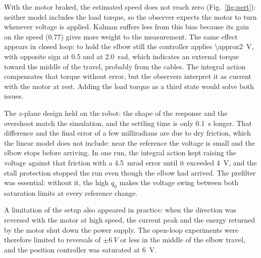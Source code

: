 \documentclass[conference,a4paper]{IEEEtran}
\begin{document}
With the motor braked, the estimated speed does not reach zero (Fig.~\ref{fig:pert}): neither model includes the load torque, so the observer expects the motor to turn whenever voltage is applied. Kalman suffers less from this bias because its gain on the speed ($0.77$) gives more weight to the measurement. The same effect appears in closed loop: to hold the elbow still the controller applies \SI{\approx2}{V}, with opposite sign at 0.5 and at \SI{2.0}{rad}, which indicates an external torque toward the middle of the travel, probably from the cables. The integral action compensates that torque without error, but the observers interpret it as current with the motor at rest. Adding the load torque as a third state would solve both issues.

The $z$-plane design held on the robot: the shape of the response and the overshoot match the simulation, and the settling time is only \SI{0.1}{s} longer. That difference and the final error of a few milliradians are due to dry friction, which the linear model does not include: near the reference the voltage is small and the elbow stops before arriving. In one run, the integral action kept raising the voltage against that friction with a \SI{4.5}{mrad} error until it exceeded \SI{4}{V}, and the stall protection stopped the run even though the elbow had arrived. The prefilter was essential: without it, the high $q_0$ makes the voltage swing between both saturation limits at every reference change.

A limitation of the setup also appeared in practice: when the direction was reversed with the motor at high speed, the current peak and the energy returned by the motor shut down the power supply. The open-loop experiments were therefore limited to reversals of $\pm\SI{6}{V}$ or less in the middle of the elbow travel, and the position controller was saturated at \SI{6}{V}.
\end{document}
